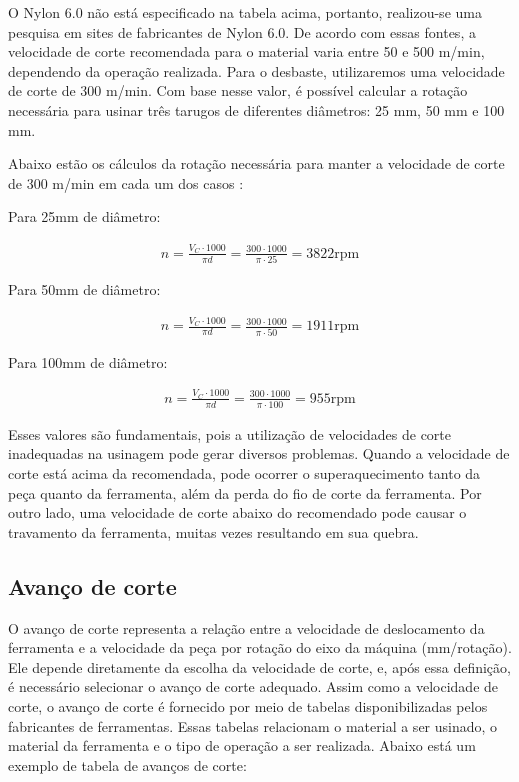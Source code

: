 O Nylon 6.0 não está especificado na tabela acima, portanto, realizou-se uma pesquisa em sites de fabricantes de Nylon 6.0. De acordo com essas fontes, a velocidade de corte recomendada para o material varia entre 50 e 500 m/min, dependendo da operação realizada. Para o desbaste, utilizaremos uma velocidade de corte de 300 m/min. Com base nesse valor, é possível calcular a rotação necessária para usinar três tarugos de diferentes diâmetros: 25 mm, 50 mm e 100 mm.

Abaixo estão os cálculos da rotação necessária para manter a velocidade de corte de 300 m/min em cada um dos casos \cite{nylon6datasheet}:

Para 25mm de diâmetro:

\begin{align}
n=\frac{V_{C} \cdot 1000}{\pi d} = \frac{300 \cdot 1000}{\pi \cdot 25} = 3822 \text{rpm}
\end{align}

Para 50mm de diâmetro:

\begin{align}
n=\frac{V_{C} \cdot 1000}{\pi d} = \frac{300 \cdot 1000}{\pi \cdot 50} = 1911 \text{rpm}  
\end{align}

Para 100mm de diâmetro:

\begin{align}
n=\frac{V_{C} \cdot 1000}{\pi d} = \frac{300 \cdot 1000}{\pi \cdot 100} = 955 \text{rpm}
\end{align}

Esses valores são fundamentais, pois a utilização de velocidades de corte inadequadas na usinagem pode gerar diversos problemas. Quando a velocidade de corte está acima da recomendada, pode ocorrer o superaquecimento tanto da peça quanto da ferramenta, além da perda do fio de corte da ferramenta. Por outro lado, uma velocidade de corte abaixo do recomendado pode causar o travamento da ferramenta, muitas vezes resultando em sua quebra.

\subsection{Avanço de corte}

O avanço de corte representa a relação entre a velocidade de deslocamento da ferramenta e a velocidade da peça por rotação do eixo da máquina (mm/rotação). Ele depende diretamente da escolha da velocidade de corte, e, após essa definição, é necessário selecionar o avanço de corte adequado.
Assim como a velocidade de corte, o avanço de corte é fornecido por meio de tabelas disponibilizadas pelos fabricantes de ferramentas. Essas tabelas relacionam o material a ser usinado, o material da ferramenta e o tipo de operação a ser realizada. Abaixo está um exemplo de tabela de avanços de corte:

